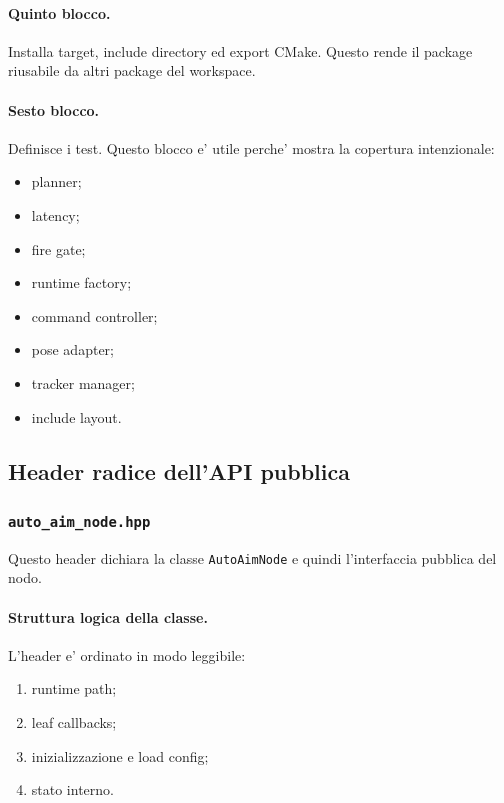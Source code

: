 \documentclass[11pt,a4paper]{article}
\newcommand{\code}[1]{\texttt{#1}}
\begin{document}
\paragraph{Quinto blocco.}
Installa target, include directory ed export CMake. Questo rende il package riusabile da altri package del workspace.

\paragraph{Sesto blocco.}
Definisce i test. Questo blocco e' utile perche' mostra la copertura intenzionale:
\begin{itemize}[leftmargin=1.4em]
  \item planner;
  \item latency;
  \item fire gate;
  \item runtime factory;
  \item command controller;
  \item pose adapter;
  \item tracker manager;
  \item include layout.
\end{itemize}

\subsection{Header radice dell'API pubblica}

\subsubsection{\code{auto\_aim\_node.hpp}}

Questo header dichiara la classe \code{AutoAimNode} e quindi l'interfaccia pubblica del nodo.

\paragraph{Struttura logica della classe.}
L'header e' ordinato in modo leggibile:
\begin{enumerate}[leftmargin=1.4em]
  \item runtime path;
  \item leaf callbacks;
  \item inizializzazione e load config;
  \item stato interno.
\end{enumerate}
\end{document}
